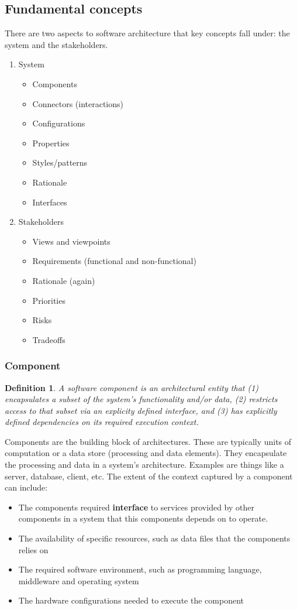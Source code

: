 \documentclass{sty/SizheArticle}
\newtheorem{definition}{Definition}
\begin{document}
\subsection{Fundamental concepts}
There are two aspects to software architecture that key concepts fall under:
the system and the stakeholders. 
\begin{enumerate}
\item System
\begin{itemize}
\item Components
\item Connectors (interactions)
\item Configurations
\item Properties
\item Styles/patterns
\item Rationale
\item Interfaces
\end{itemize}
\item Stakeholders
\begin{itemize}
\item Views and viewpoints
\item Requirements (functional and non-functional)
\item Rationale (again)
\item Priorities
\item Risks
\item Tradeoffs
\end{itemize}
\end{enumerate}

\subsubsection{Component}
\begin{definition}
A software component is an architectural entity that (1) encapsulates a subset
of the system's functionality and/or data, (2) restricts access to that subset
via an explicity defined interface, and (3) has explicitly defined dependencies 
on its required execution context.
\end{definition}

Components are the building block of architectures. These are typically units
of computation or a data store (processing and data elements). They encapsulate
the processing and data in a system's architecture.
Examples are things like a server, database, client, etc.
The extent of the context captured by a component can include:
\begin{itemize}
\item The components required \textbf{interface} to services provided by other
components in a system that this components depends on to operate.
\item The availability of specific resources, such as data files that the
components relies on
\item The required software environment, such as programming language, middleware
and operating system
\item The hardware configurations needed to execute the component
\end{itemize}
\end{document}
